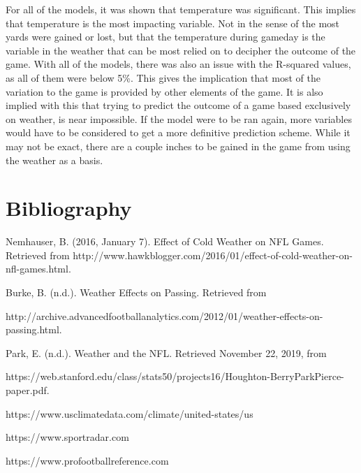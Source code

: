 \documentclass[12pt]{article}
\begin{document}
For all of the models, it was shown that temperature was significant. This implies that temperature is the most impacting variable. Not in the sense of the most yards were gained or lost, but that the temperature during gameday is the variable in the weather that can be most relied on to decipher the outcome of the game. With all of the models, there was also an issue with the R-squared values, as all of them were below 5\%. This gives the implication that most of the variation to the game is provided by other elements of the game. It is also implied with this that trying to predict the outcome of a game based exclusively on weather, is near impossible. If the model were to be ran again, more variables would have to be considered to get a more definitive prediction scheme. While it may not be exact, there are a couple inches to be gained in the game from using the weather as a basis.

\section{Bibliography}
Nemhauser, B. (2016, January 7). Effect of Cold Weather on NFL Games. Retrieved from http://www.hawkblogger.com/2016/01/effect-of-cold-weather-on-nfl-games.html.

Burke, B. (n.d.). Weather Effects on Passing. Retrieved from

 http://archive.advancedfootballanalytics.com/2012/01/weather-effects-on-passing.html.

Park, E. (n.d.). Weather and the NFL. Retrieved November 22, 2019, from

 https://web.stanford.edu/class/stats50/projects16/Houghton-BerryParkPierce-paper.pdf.

https://www.usclimatedata.com/climate/united-states/us

https://www.sportradar.com

https://www.profootballreference.com
\end{document}
